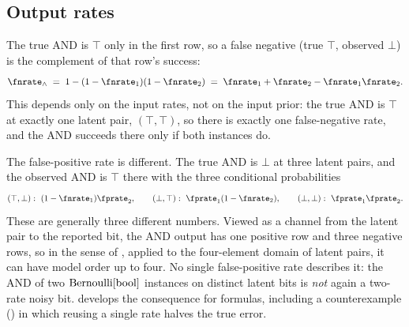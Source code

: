 \subsection*{Output rates}

The true AND is $\top$ only in the first row, so a false negative (true $\top$,
observed $\bot$) is the complement of that row's success:
\begin{equation}
\label{eq:and-fnr}
  \fnrate_\wedge \;=\; 1 - (1 - \fnrate_1)(1 - \fnrate_2)
                 \;=\; \fnrate_1 + \fnrate_2 - \fnrate_1 \fnrate_2.
\end{equation}
This depends only on the input rates, not on the input prior: the true AND is
$\top$ at exactly one latent pair, $(\top, \top)$, so there is exactly one
false-negative rate, and the AND succeeds there only if both instances do.

The false-positive rate is different. The true AND is $\bot$ at three latent
pairs, and the observed AND is $\top$ there with the three conditional
probabilities
\begin{equation}
\label{eq:and-negative-rows}
  (\top,\bot):\ (1 - \fnrate_1)\fprate_2,
  \qquad
  (\bot,\top):\ \fprate_1(1 - \fnrate_2),
  \qquad
  (\bot,\bot):\ \fprate_1 \fprate_2 .
\end{equation}
These are generally three different numbers. Viewed as a channel from the
latent pair to the reported bit, the AND output has
one positive row and three negative rows, so in the sense of
, applied to the four-element domain of latent pairs, it
can have model order up to four. No single false-positive
rate describes it: the AND of two $\mathrm{Bernoulli}[\mathrm{bool}]$ instances on distinct
latent bits is \emph{not} again a two-rate noisy bit.
 develops the consequence for formulas, including a
counterexample () in which reusing a single
rate halves the true error.

